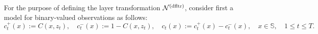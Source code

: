 \documentclass[twoside,11pt]{article}
\def\clP{{\cal P}}
\def\bS{\begin{slide}}
\def\clP{{\cal P}}
\def\clP{{\cal P}}
\def\bS{\mathbb{S}}
\def\dfltr{{\text{\rm (dfltr)}}}
\begin{document}

For the purpose of defining the layer transformation ${\cal N}^\dfltr$, consider first a model for binary-valued observations as follows:
\begin{equation*}
c_t^{+}(x) := C(x, z_{t}),\quad c_t^{-}(x) := 1- C(x, z_{t}),\quad
c_t(x):=c_t^{+}(x) - c_t^{-}(x),\quad x\in\bS, \quad 1\leq t\leq T.
\end{equation*}
\end{document}
